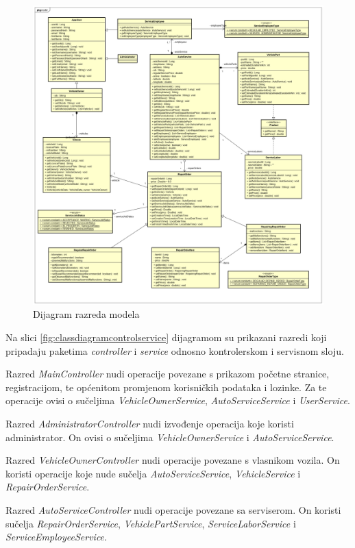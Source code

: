 		\begin{figure}[H]
			\centering
			\includegraphics[width=1.0\linewidth]{dijagrami/class_diagram_model.png}
			\caption{Dijagram razreda modela}
			\label{fig:classdiagrammodel}
		\end{figure}
	
		Na slici \ref{fig:classdiagramcontrolservice} dijagramom su prikazani razredi koji pripadaju paketima \textit{controller} i \textit{service} odnosno kontrolerskom i servisnom sloju.
		
		Razred \textit{MainController} nudi operacije povezane s prikazom početne stranice, registracijom, te općenitom promjenom korisničkih podataka i lozinke. Za te operacije ovisi o sučeljima \textit{VehicleOwnerService}, \textit{AutoServiceService} i \textit{UserService}.
		
		Razred \textit{AdministratorController} nudi izvođenje operacija koje koristi administrator. On ovisi o sučeljima \textit{VehicleOwnerService} i \textit{AutoServiceService}. 
		
		Razred \textit{VehicleOwnerController} nudi operacije povezane s vlasnikom vozila. On koristi operacije koje nude sučelja \textit{AutoServiceService}, \textit{VehicleService} i \textit{RepairOrderService}.
		
		Razred \textit{AutoServiceController} nudi operacije povezane sa serviserom. On koristi sučelja \textit{RepairOrderService}, \textit{VehiclePartService}, \textit{ServiceLaborService} i \textit{ServiceEmployeeService}.
		
